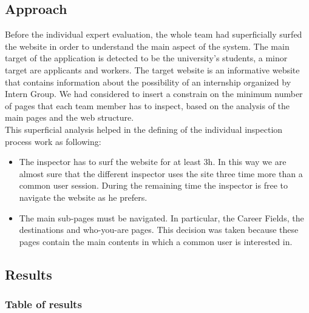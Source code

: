 \documentclass[11pt, letterpaper]{article}
\begin{document}
\subsection{Approach}
Before the individual expert evaluation, the whole team had superficially surfed the website in order to understand the main aspect of the system. The main target of the application is detected to be the university’s students, a minor target are applicants and workers. The target website is an informative website that contains information about the possibility of an internship organized by Intern Group. We had considered to insert a constrain on the minimum number of pages that each team member has to inspect, based on the analysis of the main pages and the web structure. \\
This superficial analysis helped in the defining of the individual inspection process work as following:
\begin{itemize}
    \item The inspector has to surf the website for at least 3h. In this way we are almost sure that the different inspector uses the site three time more than a common user session. During the remaining time the inspector is free to navigate the website as he prefers.
    \item The main sub-pages must be navigated. In particular, the Career Fields, the destinations and who-you-are pages. This decision was taken because these pages contain the main contents in which a common user is interested in.


\end{itemize}

\subsection{Results}

\subsubsection{Table of results}
\end{document}
